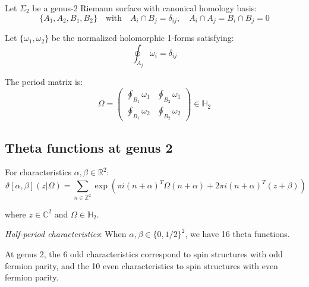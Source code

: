 \begin{definition}
\label{def:period-matrix-g2}
Let $\Sigma_2$ be a genus-2 Riemann surface with canonical homology basis:
\begin{equation}
\{A_1, A_2, B_1, B_2\} \quad \text{with} \quad A_i \cap B_j = \delta_{ij}, \quad A_i \cap A_j = B_i \cap B_j = 0
\end{equation}

Let $\{\omega_1, \omega_2\}$ be the normalized holomorphic 1-forms satisfying:
\begin{equation}
\oint_{A_j} \omega_i = \delta_{ij}
\end{equation}

The period matrix is:
\begin{equation}
\Omega = \begin{pmatrix}
\oint_{B_1} \omega_1 & \oint_{B_2} \omega_1 \\
\oint_{B_1} \omega_2 & \oint_{B_2} \omega_2
\end{pmatrix}
\in \mathbb{H}_2
\end{equation}
\end{definition}

\subsection{Theta functions at genus 2}

\begin{definition}
\label{def:theta-genus2}
For characteristics $\alpha, \beta \in \mathbb{R}^2$:
\begin{equation}
\vartheta[\alpha, \beta](z|\Omega) = \sum_{n \in \mathbb{Z}^2} \exp\left(\pi i (n+\alpha)^T \Omega (n+\alpha)
+ 2\pi i (n+\alpha)^T (z+\beta)\right)
\end{equation}

where $z \in \mathbb{C}^2$ and $\Omega \in \mathbb{H}_2$.

\emph{Half-period characteristics}: When $\alpha, \beta \in \{0, 1/2\}^2$, we have 16 theta functions.
\end{definition}

\begin{theorem}
\label{thm:odd-even-g2}
At genus 2, the 6 odd characteristics correspond to spin structures with odd fermion parity, and the 10 even characteristics to spin structures with even fermion parity.
\end{theorem}

